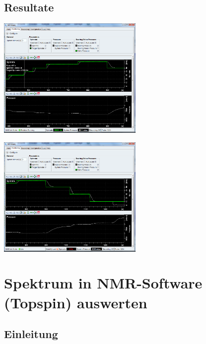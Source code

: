 \documentclass[a4paper]{article}
\newenvironment{Figure}
	{\par\medskip\noindent\minipage{\linewidth}}
	{\endminipage\par\medskip}
\begin{document}
\begin{multicols*}{2}
			\subsection{Resultate}
				
				\begin{Figure}
					\centering
					\includegraphics[width=7cm]{images/gruppe1_auf.png}
					\label{fig:topspin_up}
					\vspace*{0.5mm}
				\end{Figure}
				
				\begin{Figure}
					\centering
					\includegraphics[width=7cm]{images/gruppe1_ab.png}
					\label{fig:topspin_down}
					\vspace*{0.5mm}
				\end{Figure}
			
		\section{Spektrum in NMR-Software (Topspin) auswerten}
		
			\subsection{Einleitung}
		

\end{multicols*}
\end{document}
